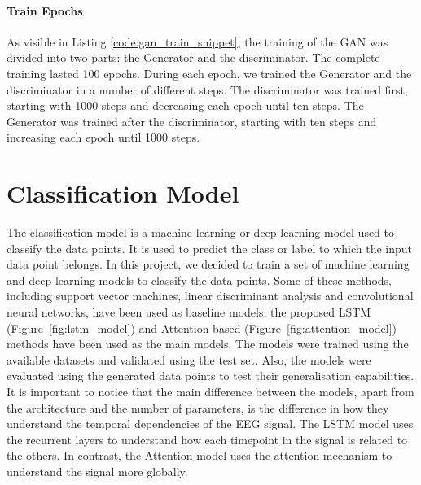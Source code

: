 \paragraph*{Train Epochs}
As visible in Listing \ref{code:gan_train_snippet}, the training of the GAN was divided into two parts: the Generator and the discriminator.
The complete training lasted 100 epochs.
During each epoch, we trained the Generator and the discriminator in a number of different steps.
The discriminator was trained first, starting with 1000 steps and decreasing each epoch until ten steps.
The Generator was trained after the discriminator, starting with ten steps and increasing each epoch until 1000 steps.


\section{Classification Model}
The classification model is a machine learning or deep learning model used to classify the data points.
It is used to predict the class or label to which the input data point belongs.
In this project, we decided to train a set of machine learning and deep learning models to classify the data points.
Some of these methods, including support vector machines, linear discriminant analysis and convolutional neural networks, have been used as baseline models, the proposed LSTM (Figure~\ref{fig:lstm_model}) and Attention-based (Figure~\ref{fig:attention_model}) methods have been used as the main models.
The models were trained using the available datasets and validated using the test set.
Also, the models were evaluated using the generated data points to test their generalisation capabilities.
It is important to notice that the main difference between the models, apart from the architecture and the number of parameters, is the difference in how they understand the temporal dependencies of the EEG signal.
The LSTM model uses the recurrent layers to understand how each timepoint in the signal is related to the others. In contrast, the Attention model uses the attention mechanism to understand the signal more globally.

